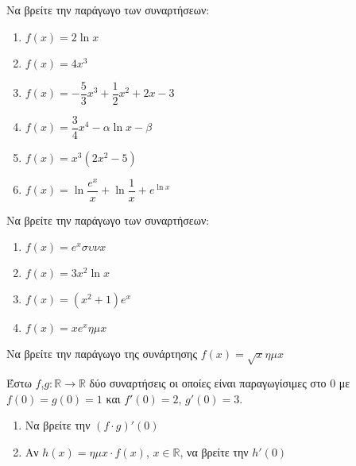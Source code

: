 \documentclass{presentation}
\begin{document}
\begin{askisi}
    Να βρείτε την παράγωγο των συναρτήσεων:
    \begin{enumerate}
        \item<1-> $f(x)=2\ln x$
        \item<2-> $f(x)=4x^3$
        \item<3-> $f(x)=-\dfrac{5}{3}x^3+\dfrac{1}{2}x^2+2x-3$
        \item<4-> $f(x)=\dfrac{3}{4}x^4-α\ln x-β$
        \item<5-> $f(x)=x^3(2x^2-5)$
        \item<6-> $f(x)=\ln \dfrac{e^x}{x}+\ln \dfrac{1}{x}+e^{\ln x}$
    \end{enumerate}

\end{askisi}

\begin{askisi}
    Να βρείτε την παράγωγο των συναρτήσεων:
    \begin{enumerate}
        \item<1-> $f(x)=e^xσυνx$
        \item<2-> $f(x)=3x^2\ln x$
        \item<3-> $f(x)=(x^2+1)e^x$
        \item<4-> $f(x)=xe^xημx$
    \end{enumerate}

\end{askisi}

\begin{askisi}
    Να βρείτε την παράγωγο της συνάρτησης $f(x)=\sqrt{x}ημx$

\end{askisi}

\begin{askisi}
    Έστω $f$,$g:\mathbb{R}\to\mathbb{R}$ δύο συναρτήσεις οι οποίες είναι παραγωγίσιμες στο $0$ με $f(0)=g(0)=1$ και $f'(0)=2$, $g'(0)=3$.

    \begin{enumerate}
        \item<1-> Να βρείτε την $(f\cdot g)'(0)$
        \item<2-> Αν $h(x)=ημx \cdot f(x)$, $x\in\mathbb{R}$, να βρείτε την $h'(0)$
    \end{enumerate}

\end{askisi}
\end{document}
